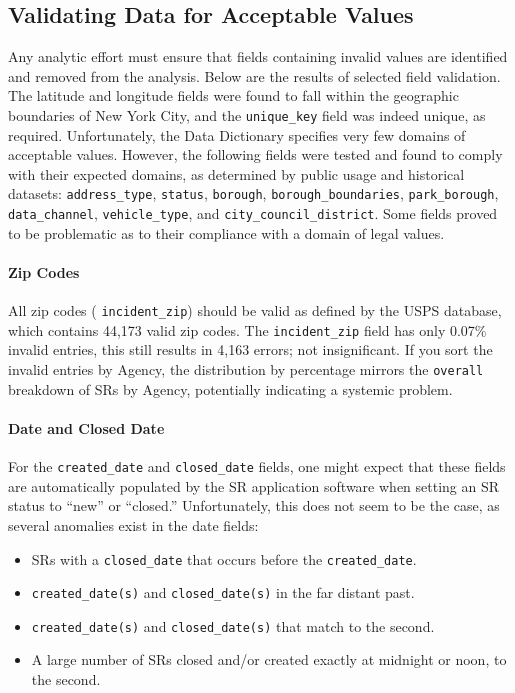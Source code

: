 \documentclass[linenumber]{jdsart}
\begin{document}
\subsection{Validating Data for Acceptable Values}
\label{sec:domain}
Any analytic effort must ensure that fields containing invalid values 
are identified and removed from the analysis. Below are the results of 
selected field validation. The latitude and longitude fields were 
found to fall within the geographic boundaries of New York City, and 
the \texttt{unique\_key} field was indeed unique, as required. 
Unfortunately, the Data Dictionary specifies very few domains of 
acceptable values. However, the following fields were tested and found 
to comply with their expected domains, as determined by public usage 
and historical datasets: \texttt{address\_type}, \texttt{status}, 
\texttt{borough}, \texttt{borough\_boundaries}, \texttt{park\_borough}, 
\texttt{data\_channel}, \texttt{vehicle\_type}, and 
\texttt{city\_council\_district}. Some fields proved to be problematic 
as to their compliance with a domain of legal values. 


\paragraph{Zip Codes}
\label{sec:zipcodesissues}
All zip codes ( \texttt{incident\_zip}) 
should be valid as defined by the USPS database, which contains 
44,173 valid zip codes. The \texttt{incident\_zip} field has 
only 0.07\% invalid entries, this still results in 4,163 errors; 
not insignificant. If you sort the invalid entries by Agency, 
the distribution by percentage mirrors the \texttt{overall} 
breakdown of SRs by Agency, potentially 
indicating a systemic problem.


\paragraph{Date and Closed Date}
\label{sec:negativeduration}
For the \texttt{created\_date} and \texttt{closed\_date} fields, one 
might expect that these fields are automatically populated by the SR 
application software when setting an SR status to ``new'' or ``closed.'' 
Unfortunately, this does not seem to be the case, as several anomalies 
exist in the date fields:
\begin{itemize}
    \item SRs with a \texttt{closed\_date} that occurs before the 
    \texttt{created\_date}.
    \item \texttt{created\_date(s)} and \texttt{closed\_date(s)} in 
    the far distant past.
    \item \texttt{created\_date(s)} and \texttt{closed\_date(s)} that 
    match to the second.
    \item A large number of SRs closed and/or created exactly at midnight 
    or noon, to the second.
\end{itemize}
\end{document}
